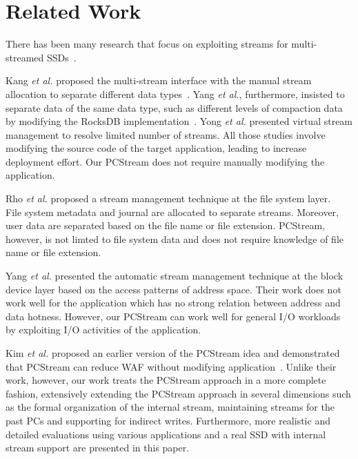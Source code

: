 \section{Related Work}
There has been many research that focus on exploiting streams
for multi-streamed SSDs~\cite{MultiStream, Level, vStream, FStream, AutoStream, PCStream}. 

Kang {\it et al.} proposed the multi-stream interface with the manual stream allocation
to separate different data types~\cite{MultiStream}. 
Yang {\it et al.}, furthermore, insisted to separate data
of the same data type, such as different levels of compaction data by 
modifying the RocksDB implementation~\cite{Level}.
Yong {\it et al.} presented virtual stream management to resolve limited number
of streams.
All those studies involve modifying the source code of the target application, leading
to increase deployment effort.
Our PCStream does not require manually modifying the application.

Rho {\it et al.} proposed a stream management technique at the file system layer.~\cite{FStream}
File system metadata and journal are allocated to separate streams.
Moreover, user data are separated based on the file name or file extension.
PCStream, however, is not limted to file system data and
does not require knowledge of file name or file extension.

Yang {\it et al.} presented the automatic stream management technique at the 
block device layer based on the access patterns of address space.
Their work does not work well for the application which has no strong relation
between address and data hotness.
However, our PCStream can work well for general I/O workloads by exploiting 
I/O activities of the application.


Kim {\it et al.} proposed an earlier version of the PCStream idea and 
demonstrated that PCStream can reduce WAF without 
modifying application~\cite{PCStream}. 
Unlike their work, however, our work treats the PCStream approach
in a more complete fashion, extensively extending the PCStream approach
in several dimensions such as the formal organization of the internal stream,
maintaining streams for the past PCs and supporting for indirect writes. 
Furthermore, more realistic and detailed 
evaluations using various applications and a real SSD with internal 
stream support are presented in this paper.
